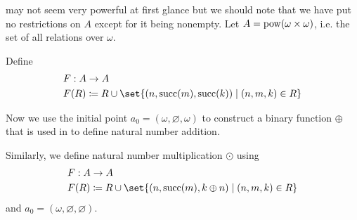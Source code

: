 \begin{example}\label{ex:thm:omega_recursion}
   may not seem very powerful at first glance but we should note that we have put no restrictions on \( A \) except for it being nonempty. Let \( A = \operatorname{pow}(\omega \times \omega) \), i.e. the set of all relations over \( \omega \).

  \begin{thmenum}
     Define
    \begin{equation*}
      \begin{aligned}
        &F: A \to A \\
        &F(R) \coloneqq R \cup \set{ (n, \op{succ}(m), \op{succ}(k)) \given (n, m, k) \in R }
      \end{aligned}
    \end{equation*}

    Now we use the initial point \( a_0 = (\omega, \varnothing, \omega) \) to construct a binary function \( \oplus \) that is used in  to define natural number addition.

     Similarly, we define natural number multiplication \( \odot \) using
    \begin{equation*}
      \begin{aligned}
        &F: A \to A \\
        &F(R) \coloneqq R \cup \set{ (n, \op{succ}(m), k \oplus n) \given (n, m, k) \in R }
      \end{aligned}
    \end{equation*}
    and \( a_0 = (\omega, \varnothing, \varnothing) \).
  \end{thmenum}
\end{example}


